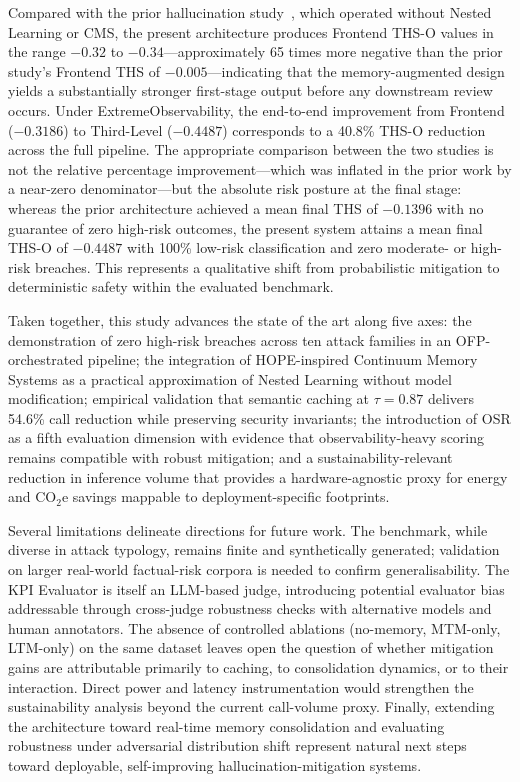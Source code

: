 \documentclass[11pt,a4paper]{article}
\begin{document}
Compared with the prior hallucination study~\cite{gosmar2025hallucination}, which operated without Nested Learning or CMS, the present architecture produces Frontend THS-O values in the range $-0.32$ to $-0.34$---approximately 65 times more negative than the prior study's Frontend THS of $-0.005$---indicating that the memory-augmented design yields a substantially stronger first-stage output before any downstream review occurs. Under ExtremeObservability, the end-to-end improvement from Frontend ($-0.3186$) to Third-Level ($-0.4487$) corresponds to a 40.8\% THS-O reduction across the full pipeline. The appropriate comparison between the two studies is not the relative percentage improvement---which was inflated in the prior work by a near-zero denominator---but the absolute risk posture at the final stage: whereas the prior architecture achieved a mean final THS of $-0.1396$ with no guarantee of zero high-risk outcomes, the present system attains a mean final THS-O of $-0.4487$ with 100\% low-risk classification and zero moderate- or high-risk breaches. This represents a qualitative shift from probabilistic mitigation to deterministic safety within the evaluated benchmark.

Taken together, this study advances the state of the art along five axes: the demonstration of zero high-risk breaches across ten attack families in an OFP-orchestrated pipeline; the integration of HOPE-inspired Continuum Memory Systems as a practical approximation of Nested Learning without model modification; empirical validation that semantic caching at $\tau=0.87$ delivers 54.6\% call reduction while preserving security invariants; the introduction of OSR as a fifth evaluation dimension with evidence that observability-heavy scoring remains compatible with robust mitigation; and a sustainability-relevant reduction in inference volume that provides a hardware-agnostic proxy for energy and CO$_2$e savings mappable to deployment-specific footprints.

Several limitations delineate directions for future work. The benchmark, while diverse in attack typology, remains finite and synthetically generated; validation on larger real-world factual-risk corpora is needed to confirm generalisability. The KPI Evaluator is itself an LLM-based judge, introducing potential evaluator bias addressable through cross-judge robustness checks with alternative models and human annotators. The absence of controlled ablations (no-memory, MTM-only, LTM-only) on the same dataset leaves open the question of whether mitigation gains are attributable primarily to caching, to consolidation dynamics, or to their interaction. Direct power and latency instrumentation would strengthen the sustainability analysis beyond the current call-volume proxy. Finally, extending the architecture toward real-time memory consolidation and evaluating robustness under adversarial distribution shift represent natural next steps toward deployable, self-improving hallucination-mitigation systems.
\end{document}
